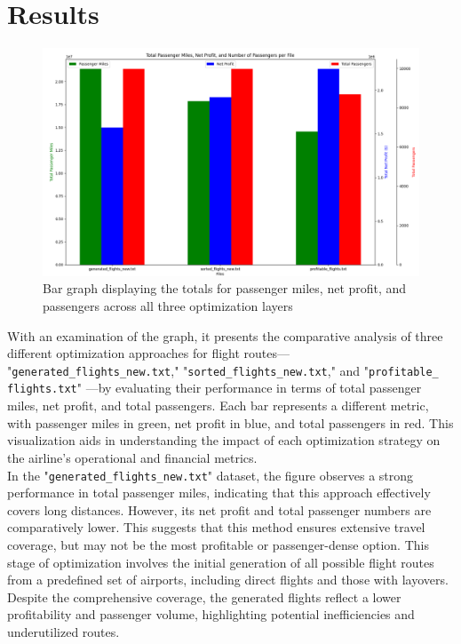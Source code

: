 \documentclass{article}
\begin{document}
\section{Results}

\begin{figure}[H] 
\centering

\begin{minipage}{\textwidth}
    \centering
    \includegraphics[width=\textwidth]{images/Figure_1.png}
    \caption {Bar graph displaying the totals for passenger miles, net profit, and passengers across all three optimization layers}
\end{minipage}

\end{figure}

With an examination of the graph, it presents the comparative analysis of three different optimization approaches for flight routes— "\texttt{generated\_flights\_new.txt}," "\texttt{sorted\_flights\_new.txt}," and "\texttt{profitable\_
flights.txt}" —by evaluating their performance in terms of total passenger miles, net profit, and total passengers. Each bar represents a different metric, with passenger miles in green, net profit in blue, and total passengers in red. This visualization aids in understanding the impact of each optimization strategy on the airline's operational and financial metrics.\\

In the "\texttt{generated\_flights\_new.txt}" dataset, the figure observes a strong performance in total passenger miles, indicating that this approach effectively covers long distances. However, its net profit and total passenger numbers are comparatively lower. This suggests that this method ensures extensive travel coverage, but may not be the most profitable or passenger-dense option. This stage of optimization involves the initial generation of all possible flight routes from a predefined set of airports, including direct flights and those with layovers. Despite the comprehensive coverage, the generated flights reflect a lower profitability and passenger volume, highlighting potential inefficiencies and underutilized routes.\\
\end{document}
